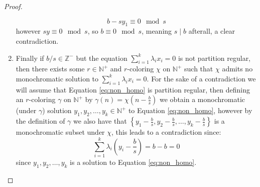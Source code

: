 \begin{proof}
\begin{enumerate}
		      \begin{equation*}
			      b - sy_1 \equiv 0 \mod s
		      \end{equation*}
		      however $sy \equiv 0 \mod s$, so $b \equiv 0 \mod s$, meaning $s \mid b$ afterall, a clear contradiction.
		\item Finally if $b / s \in \mathbb{Z}^{-}$ but the equation $\sum_{i = 1}^k \lambda_i x_i = 0$ is not partition regular, then there exists some $r \in \mathbb{N}^{+}$ and $r$-coloring $\chi$ on $\mathbb{N}^{+}$ such that $\chi$ admits no monochromatic solution to $\sum_{i = 1}^k \lambda_i x_i = 0$. For the sake of a contradiction we will assume that Equation \eqref{eq:non_homo} is partition regular, then defining an $r$-coloring $\gamma$ on $\mathbb{N}^{+}$ by $\gamma(n) = \chi(n - \frac{b}{s})$ we obtain a monochromatic (under $\gamma$) solution $y_1, y_2, \ldots, y_k \in \mathbb{N}^{+}$ to Equation \eqref{eq:non_homo}, however by the definition of $\gamma$ we also have that $\left\{y_1 - \frac{b}{s}, y_2 - \frac{b}{s}, \ldots, y_k - \frac{b}{s}\right\}$ is a monochromatic subset under $\chi$, this leads to a contradiction since:
		      \begin{equation*}
			      \sum_{i = 1}^{k} \lambda_i \left(y_i - \frac{b}{s}\right) = b - b = 0
		      \end{equation*}
		      since $y_1, y_2, \ldots, y_k$ is a solution to Equation \eqref{eq:non_homo}.\qedhere
	\end{enumerate}
\end{proof}


